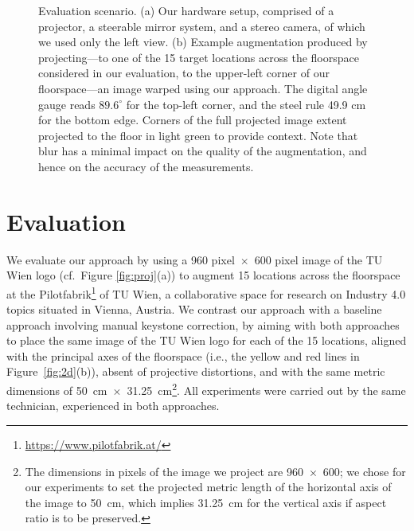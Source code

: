 \documentclass[review]{elsarticle}
\begin{document}
\begin{figure}
    \centering
    \quad
    \caption{Evaluation scenario. (a) Our hardware setup, comprised of a projector, a steerable mirror system, and a stereo camera, of which we used only the left view. (b) Example augmentation produced by projecting---to one of the 15 target locations across the floorspace considered in our evaluation, to the upper-left corner of our floorspace---an image warped using our approach. The digital angle gauge reads $89.6^\circ{}$ for the top-left corner, and the steel rule 49.9 cm for the bottom edge. Corners of the full projected image extent projected to the floor in light green to provide context. Note that blur has a minimal impact on the quality of the augmentation, and hence on the accuracy of the measurements.}
    \label{fig:eval}
\end{figure}

\section{Evaluation}

We evaluate our approach by using a 960 pixel~$\times$~600 pixel image of the TU Wien logo (cf.\ Figure \ref{fig:proj}(a)) to augment 15 locations across the floorspace at the Pilotfabrik\footnote{\url{https://www.pilotfabrik.at/}} of TU Wien, a collaborative space for research on Industry 4.0 topics situated in Vienna, Austria. We contrast our approach with a baseline approach involving manual keystone correction, by aiming with both approaches to place the same image of the TU Wien logo for each of the 15 locations, aligned with the principal axes of the floorspace (i.e., the yellow and red lines in Figure~\ref{fig:2d}(b)), absent of projective distortions, and with the same metric dimensions of 50~cm~$\times$~31.25~cm\footnote{The dimensions in pixels of the image we project are 960~$\times$~600; we chose for our experiments to set the projected metric length of the horizontal axis of the image to 50~cm, which implies 31.25~cm for the vertical axis if aspect ratio is to be preserved.}. All experiments were carried out by the same technician, experienced in both approaches.
\end{document}
